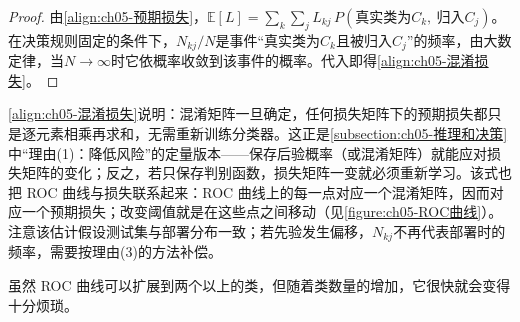 \documentclass[../../main.tex]{subfiles}
\begin{document}
\begin{proof}
由\eqref{align:ch05-预期损失}，$\mathbb{E}[L]=\sum_{k}\sum_{j}L_{kj}\,P(\text{真实类为}C_k,\ \text{归入}C_j)$。在决策规则固定的条件下，$N_{kj}/N$是事件“真实类为$C_k$且被归入$C_j$”的频率，由大数定律，当$N\to\infty$时它依概率收敛到该事件的概率。代入即得\eqref{align:ch05-混淆损失}。
\end{proof}

\begin{remark}
\eqref{align:ch05-混淆损失}说明：混淆矩阵一旦确定，任何损失矩阵下的预期损失都只是逐元素相乘再求和，无需重新训练分类器。这正是\cref{subsection:ch05-推理和决策}中“理由(1)：降低风险”的定量版本——保存后验概率（或混淆矩阵）就能应对损失矩阵的变化；反之，若只保存判别函数，损失矩阵一变就必须重新学习。该式也把 ROC 曲线与损失联系起来：ROC 曲线上的每一点对应一个混淆矩阵，因而对应一个预期损失；改变阈值就是在这些点之间移动（见\cref{figure:ch05-ROC曲线}）。注意该估计假设测试集与部署分布一致；若先验发生偏移，$N_{kj}$不再代表部署时的频率，需要按理由(3)的方法补偿。
\end{remark}

虽然 ROC 曲线可以扩展到两个以上的类，但随着类数量的增加，它很快就会变得十分烦琐。
\end{document}
